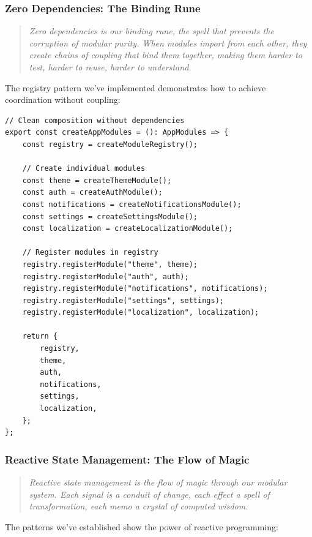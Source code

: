 \documentclass[11pt]{article}
\begin{document}
\subsubsection{Zero Dependencies: The Binding Rune}

\begin{quote}
\emph{Zero dependencies is our binding rune, the spell that prevents the corruption of modular purity. When modules import from each other, they create chains of coupling that bind them together, making them harder to test, harder to reuse, harder to understand.}
\end{quote}

The registry pattern we've implemented demonstrates how to achieve coordination without coupling:

\begin{lstlisting}[style=typescript]
// Clean composition without dependencies
export const createAppModules = (): AppModules => {
    const registry = createModuleRegistry();
    
    // Create individual modules
    const theme = createThemeModule();
    const auth = createAuthModule();
    const notifications = createNotificationsModule();
    const settings = createSettingsModule();
    const localization = createLocalizationModule();

    // Register modules in registry
    registry.registerModule("theme", theme);
    registry.registerModule("auth", auth);
    registry.registerModule("notifications", notifications);
    registry.registerModule("settings", settings);
    registry.registerModule("localization", localization);

    return {
        registry,
        theme,
        auth,
        notifications,
        settings,
        localization,
    };
};
\end{lstlisting}

\subsubsection{Reactive State Management: The Flow of Magic}

\begin{quote}
\emph{Reactive state management is the flow of magic through our modular system. Each signal is a conduit of change, each effect a spell of transformation, each memo a crystal of computed wisdom.}
\end{quote}

The patterns we've established show the power of reactive programming:
\end{document}
